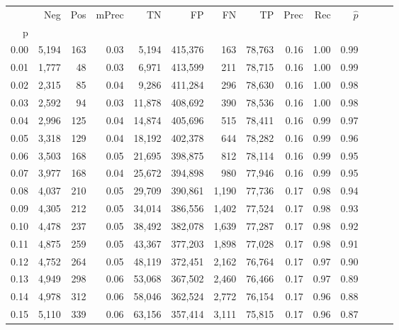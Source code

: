 \begin{tabular}{rrrrrrrrrrrrrr}
\toprule
{} &    Neg &    Pos & mPrec &       TN &       FP &      FN &      TP &  Prec &   Rec & $\hat{p}$ \\
p    &        &        &       &          &          &         &         &       &       &           \\
\midrule
0.00 &  5,194 &    163 &  0.03 &    5,194 &  415,376 &     163 &  78,763 &  0.16 &  1.00 &      0.99 \\
0.01 &  1,777 &     48 &  0.03 &    6,971 &  413,599 &     211 &  78,715 &  0.16 &  1.00 &      0.99 \\
0.02 &  2,315 &     85 &  0.04 &    9,286 &  411,284 &     296 &  78,630 &  0.16 &  1.00 &      0.98 \\
0.03 &  2,592 &     94 &  0.03 &   11,878 &  408,692 &     390 &  78,536 &  0.16 &  1.00 &      0.98 \\
0.04 &  2,996 &    125 &  0.04 &   14,874 &  405,696 &     515 &  78,411 &  0.16 &  0.99 &      0.97 \\
0.05 &  3,318 &    129 &  0.04 &   18,192 &  402,378 &     644 &  78,282 &  0.16 &  0.99 &      0.96 \\
0.06 &  3,503 &    168 &  0.05 &   21,695 &  398,875 &     812 &  78,114 &  0.16 &  0.99 &      0.95 \\
0.07 &  3,977 &    168 &  0.04 &   25,672 &  394,898 &     980 &  77,946 &  0.16 &  0.99 &      0.95 \\
0.08 &  4,037 &    210 &  0.05 &   29,709 &  390,861 &   1,190 &  77,736 &  0.17 &  0.98 &      0.94 \\
0.09 &  4,305 &    212 &  0.05 &   34,014 &  386,556 &   1,402 &  77,524 &  0.17 &  0.98 &      0.93 \\
0.10 &  4,478 &    237 &  0.05 &   38,492 &  382,078 &   1,639 &  77,287 &  0.17 &  0.98 &      0.92 \\
0.11 &  4,875 &    259 &  0.05 &   43,367 &  377,203 &   1,898 &  77,028 &  0.17 &  0.98 &      0.91 \\
0.12 &  4,752 &    264 &  0.05 &   48,119 &  372,451 &   2,162 &  76,764 &  0.17 &  0.97 &      0.90 \\
0.13 &  4,949 &    298 &  0.06 &   53,068 &  367,502 &   2,460 &  76,466 &  0.17 &  0.97 &      0.89 \\
0.14 &  4,978 &    312 &  0.06 &   58,046 &  362,524 &   2,772 &  76,154 &  0.17 &  0.96 &      0.88 \\
0.15 &  5,110 &    339 &  0.06 &   63,156 &  357,414 &   3,111 &  75,815 &  0.17 &  0.96 &      0.87 \\

\end{tabular}
